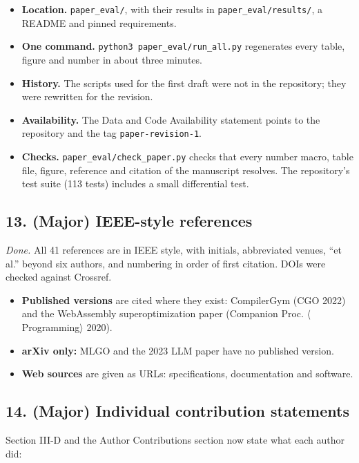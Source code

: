 \documentclass[11pt,a4paper]{article}
\begin{document}
\begin{itemize}
\item \textbf{Location.} \texttt{paper\_eval/}, with their results in \texttt{paper\_eval/results/}, a README and pinned requirements.
\item \textbf{One command.} \texttt{python3 paper\_eval/run\_all.py} regenerates every table, figure and number in about three minutes.
\item \textbf{History.} The scripts used for the first draft were not in the repository; they were rewritten for the revision.
\item \textbf{Availability.} The Data and Code Availability statement points to the repository and the tag \texttt{paper-revision-1}.
\item \textbf{Checks.} \texttt{paper\_eval/check\_paper.py} checks that every number macro, table file, figure, reference and citation of the manuscript resolves. The repository's test suite (113 tests) includes a small differential test.
\end{itemize}
\subsection*{13. (Major) IEEE-style references}
\emph{Done.} All 41 references are in IEEE style, with initials, abbreviated venues, ``et al.'' beyond six authors, and numbering in order of first citation. DOIs were checked against Crossref.

\begin{itemize}
\item \textbf{Published versions} are cited where they exist: CompilerGym (CGO 2022) and the WebAssembly superoptimization paper (Companion Proc. $\langle$Programming$\rangle$ 2020).
\item \textbf{arXiv only:} MLGO and the 2023 LLM paper have no published version.
\item \textbf{Web sources} are given as URLs: specifications, documentation and software.
\end{itemize}
\subsection*{14. (Major) Individual contribution statements}
Section III-D and the Author Contributions section now state what each author did:
\end{document}
